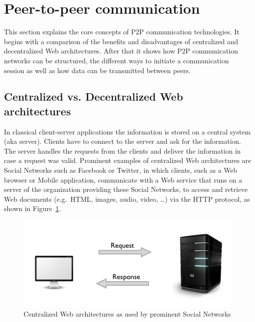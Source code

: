 
\section{Peer-to-peer communication}
\label{sec:p2p_communication}

This section explains the core concepts of \gls{P2P} communication technologies. It begins with a comparison of the benefits and disadvantages of centralized and decentralized Web architectures. After that it shows how \gls{P2P} communication networks can be structured, the different ways to initiate a communication session as well as how data can be transmitted between peers.

\subsection{Centralized vs. Decentralized Web architectures}
\label{sec:central_decentral_arch}

In classical client-server applications the information is stored on a central system (aka server). Clients have to connect to the server and ask for the information. The server handles the requests from the clients and deliver the information in case a request was valid. Prominent examples of centralized Web architectures are Social Networks such as Facebook or Twitter, in which clients, such as a Web browser or Mobile application, communicate with a Web service that runs on a server of the organization providing these Social Networks, to access and retrieve Web documents (e.g.\ \gls{HTML}, images, audio, video, \ldots) via the \gls{HTTP} protocol, as shown in Figure~\ref{fig:p2p_central_server}. \@

\begin{figure}[H]
	\centering
		\includegraphics[width=0.9\columnwidth]{images/client-server-web.png}
	\caption[Centralized Web architectures as used by prominent Social Networks]{Centralized Web architectures as used by prominent Social Networks \citep{codeTuts}}
\label{fig:p2p_central_server}
\end{figure}

